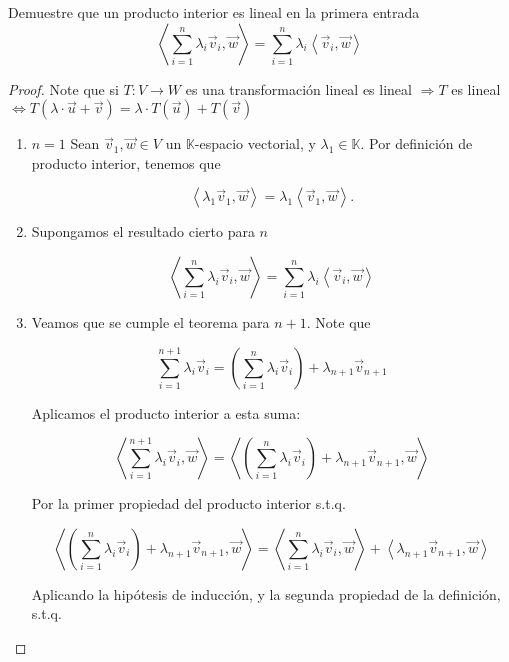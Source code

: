 \documentclass[12pt]{article}
\newcommand\K{\ensuremath{\mathbb{K}}}
\begin{document}
\begin{theorem}
    Demuestre que un producto interior es lineal en la primera entrada
    $$\left\langle \sum_{i=1}^{n} \lambda_i {\vec{v}}_{i}, \vec{w} \right\rangle = \sum_{i=1}^{n}\lambda_i  \left\langle {\vec{v}}_{i}, \vec{w} \right\rangle$$
\end{theorem}

\begin{proof}
    Note que si $T : V \to W$ es una transformación lineal es lineal $\Rightarrow T$ es lineal $\iff T(\lambda \cdot \vec{u} + \vec{v}) = \lambda \cdot T(\vec{u}) + T(\vec{v})$ 

    \begin{enumerate}
        \item $n=1$ Sean $\vec{v}_1, \vec{w} \in V$ un $\K$-espacio vectorial, y $\lambda_1 \in \K$. Por definición de producto interior, tenemos que 

        $$\left\langle \lambda_1 \vec{v}_1, \vec{w} \right\rangle = \lambda_1 \left\langle \vec{v}_1, \vec{w} \right\rangle.$$

        \item Supongamos el resultado cierto para $n$

        $$\left\langle \sum_{i=1}^{n} \lambda_i \vec{v}_i, \vec{w} \right\rangle = \sum_{i=1}^{n} \lambda_i \left\langle \vec{v}_i, \vec{w} \right\rangle$$

        \item Veamos que se cumple el teorema para $n+1$. Note que 

        $$\sum_{i=1}^{n+1} \lambda_i \vec{v}_i = \left( \sum_{i=1}^{n} \lambda_i \vec{v}_i \right) + \lambda_{n+1} \vec{v}_{n+1}$$

        Aplicamos el producto interior a esta suma:

        $$\left\langle \sum_{i=1}^{n+1} \lambda_i \vec{v}_i, \vec{w} \right\rangle = \left\langle \left( \sum_{i=1}^{n} \lambda_i \vec{v}_i \right) + \lambda_{n+1} \vec{v}_{n+1}, \vec{w} \right\rangle$$

        Por la primer propiedad del producto interior s.t.q.

        $$\left\langle \left( \sum_{i=1}^{n} \lambda_i \vec{v}_i \right) + \lambda_{n+1} \vec{v}_{n+1}, \vec{w} \right\rangle = \left\langle \sum_{i=1}^{n} \lambda_i \vec{v}_i, \vec{w} \right\rangle + \left\langle \lambda_{n+1} \vec{v}_{n+1}, \vec{w} \right\rangle$$

        Aplicando la hipótesis de inducción, y la segunda propiedad de la definición, s.t.q.


\end{enumerate}
\end{proof}
\end{document}
